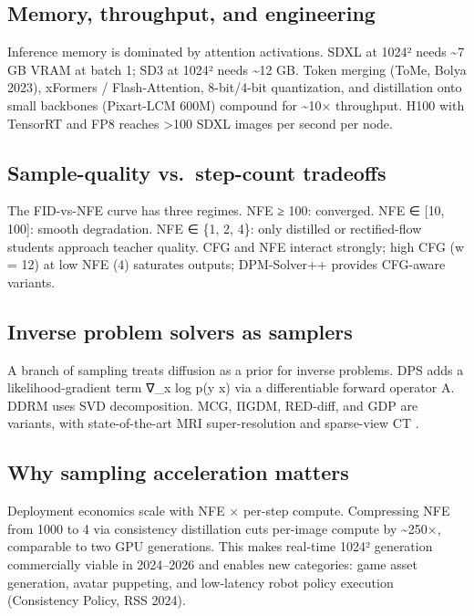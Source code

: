 \documentclass{article}
\begin{document}
\subsection{Memory, throughput, and engineering}\label{memory-throughput-and-engineering}

Inference memory is dominated by attention activations. SDXL at 1024² needs \textasciitilde7 GB VRAM at batch 1; SD3 at 1024² needs \textasciitilde12 GB. Token merging (ToMe, Bolya 2023), xFormers / Flash-Attention, 8-bit/4-bit quantization, and distillation onto small backbones (Pixart-LCM 600M) compound for \textasciitilde10× throughput. H100 with TensorRT and FP8 reaches \textgreater100 SDXL images per second per node.

\subsection{Sample-quality vs.~step-count tradeoffs}\label{sample-quality-vs.-step-count-tradeoffs}

The FID-vs-NFE curve has three regimes. NFE ≥ 100: converged. NFE ∈ {[}10, 100{]}: smooth degradation. NFE ∈ \{1, 2, 4\}: only distilled or rectified-flow students approach teacher quality. CFG and NFE interact strongly; high CFG (w = 12) at low NFE (4) saturates outputs; DPM-Solver++ \citep{lu2022dpmsolverafastodes} provides CFG-aware variants.

\subsection{Inverse problem solvers as samplers}\label{inverse-problem-solvers-as-samplers}

A branch of sampling treats diffusion as a prior for inverse problems. DPS \citep{chung2023diffusionposterior} adds a likelihood-gradient term ∇\_x log p(y \textbar{} x) via a differentiable forward operator A. DDRM \citep{kawar2022denoisingdiffusion} uses SVD decomposition. MCG, ΠGDM, RED-diff, and GDP are variants, with state-of-the-art MRI super-resolution and sparse-view CT \citep{singh20242024}.

\subsection{Why sampling acceleration matters}\label{why-sampling-acceleration-matters}

Deployment economics scale with NFE × per-step compute. Compressing NFE from 1000 to 4 via consistency distillation cuts per-image compute by \textasciitilde250×, comparable to two GPU generations. This makes real-time 1024² generation commercially viable in 2024--2026 and enables new categories: game asset generation, avatar puppeting, and low-latency robot policy execution (Consistency Policy, RSS 2024).
\end{document}
